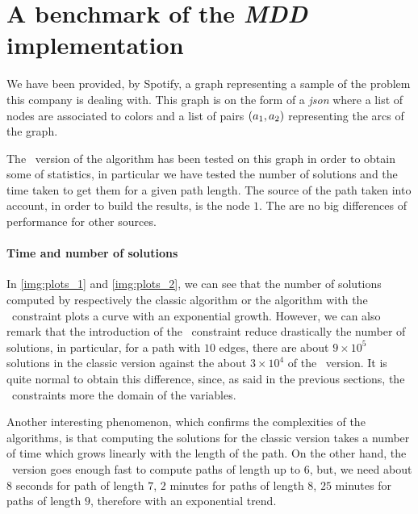 \section{A benchmark of the \textit{MDD} implementation}

We have been provided, by Spotify, a graph representing a sample of the problem this company is dealing with. This graph is on the form of a \textit{json} where a list of nodes are associated to colors and a list of pairs $(a_1, a_2)$ representing the arcs of the graph.

The \mdd\ version of the algorithm has been tested on this graph in order to obtain some of statistics, in particular we have tested the number of solutions and the time taken to get them for a given path length. The source of the path taken into account, in order to build the results, is the node $1$. The are no big differences of performance for other sources.



\paragraph{Time and number of solutions}
In \cref{img:plots_1} and \cref{img:plots_2}, we can see that the number of solutions computed by respectively the classic algorithm or the algorithm with the \alldiff\ constraint plots a curve with an exponential growth. However, we can also remark that the introduction of the \alldiff\ constraint reduce drastically the number of solutions, in particular, for a path with $10$ edges, there are about $9 \times 10^5$ solutions in the classic version against the about $3 \times 10^4$ of the \alldiff\ version. It is quite normal to obtain this difference, since, as said in the previous sections, the \alldiff\ constraints more the domain of the variables.

Another interesting phenomenon, which confirms the complexities of the algorithms, is that computing the solutions for the classic version takes a number of time which grows linearly with the length of the path. On the other hand, the \alldiff\ version goes enough fast to compute paths of length up to $6$, but, we need about $8$ seconds for path of length $7$, $2$ minutes for paths of length $8$, $25$ minutes for paths of length $9$, therefore with an exponential trend.

